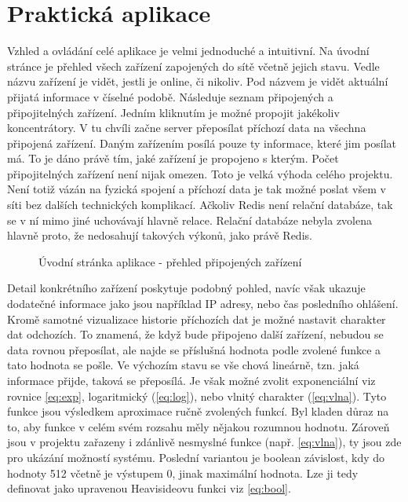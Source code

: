 \chapter{Praktická aplikace}
Vzhled a ovládání celé aplikace je velmi jednoduché a intuitivní. Na úvodní stránce je přehled všech zařízení zapojených do sítě včetně jejich stavu. Vedle názvu zařízení je vidět, jestli je online, či nikoliv. Pod názvem je vidět aktuální přijatá informace v číselné podobě. Následuje seznam připojených a připojitelných zařízení. Jedním kliknutím je možné propojit jakékoliv koncentrátory. V tu chvíli začne server přeposílat příchozí data na všechna připojená zařízení. Daným zařízením posílá pouze ty informace, které jim posílat má. To je dáno právě tím, jaké zařízení je propojeno s kterým. Počet připojitelných zařízení není nijak omezen. Toto je velká výhoda celého projektu. Není totiž vázán na fyzická spojení a příchozí data je tak možné poslat všem v síti bez dalších technických komplikací. Ačkoliv Redis \cite{redis} není relační databáze, tak se v ní mimo jiné uchovávají hlavně relace. Relační databáze nebyla zvolena hlavně proto, že nedosahují takových výkonů, jako právě Redis.

\begin{figure}[H]
    \centering
	\caption{Úvodní stránka aplikace - přehled připojených zařízení}
	\label{fig:speedy1}
\end{figure}

Detail konkrétního zařízení poskytuje podobný pohled, navíc však ukazuje dodatečné informace jako jsou například IP adresy, nebo čas posledního ohlášení. Kromě samotné vizualizace historie příchozích dat je možné nastavit charakter dat odchozích. To znamená, že když bude připojeno další zařízení, nebudou se data rovnou přeposílat, ale najde se příslušná hodnota podle zvolené funkce a tato hodnota se pošle. Ve výchozím stavu se vše chová lineárně, tzn. jaká informace přijde, taková se přeposílá. Je však možné zvolit exponenciální viz rovnice \ref{eq:exp}, logaritmický (\ref{eq:log}), nebo vlnitý charakter (\ref{eq:vlna}). Tyto funkce jsou výsledkem aproximace ručně zvolených funkcí. Byl kladen důraz na to, aby funkce v celém svém rozsahu měly nějakou rozumnou hodnotu. Zároveň jsou v projektu zařazeny i zdánlivě nesmyslné funkce (např. \ref{eq:vlna}), ty jsou zde pro ukázání možností systému. Poslední variantou je boolean závislost, kdy do hodnoty 512 včetně je výstupem 0, jinak maximální hodnota. Lze ji tedy definovat jako upravenou Heavisideovu funkci viz \ref{eq:bool}.

